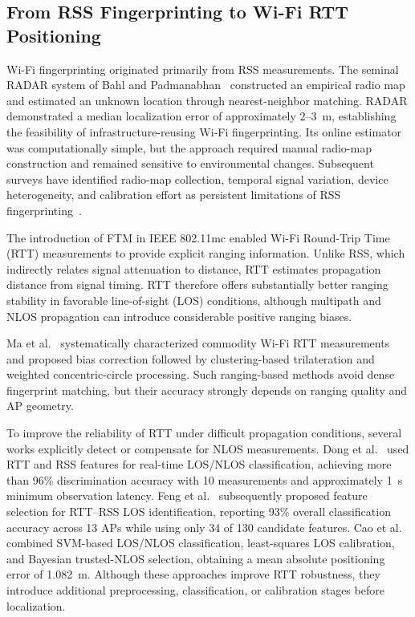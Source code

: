 \subsection{From RSS Fingerprinting to Wi-Fi RTT Positioning}
\label{subsec:rw_rss_rtt}

Wi-Fi fingerprinting originated primarily from RSS measurements. The seminal RADAR system of Bahl and Padmanabhan~\cite{bahl2000radar} constructed an empirical radio map and estimated an unknown location through nearest-neighbor matching. RADAR demonstrated a median localization error of approximately 2--3~m, establishing the feasibility of infrastructure-reusing Wi-Fi fingerprinting. Its online estimator was computationally simple, but the approach required manual radio-map construction and remained sensitive to environmental changes. Subsequent surveys have identified radio-map collection, temporal signal variation, device heterogeneity, and calibration effort as persistent limitations of RSS fingerprinting~\cite{he2016wifiFingerprint}.

The introduction of FTM in IEEE 802.11mc enabled Wi-Fi Round-Trip Time (RTT) measurements to provide explicit ranging information. Unlike RSS, which indirectly relates signal attenuation to distance, RTT estimates propagation distance from signal timing. RTT therefore offers substantially better ranging stability in favorable line-of-sight (LOS) conditions, although multipath and NLOS propagation can introduce considerable positive ranging biases.

Ma et al.~\cite{ma2022rtt} systematically characterized commodity Wi-Fi RTT measurements and proposed bias correction followed by clustering-based trilateration and weighted concentric-circle processing. Such ranging-based methods avoid dense fingerprint matching, but their accuracy strongly depends on ranging quality and AP geometry.

To improve the reliability of RTT under difficult propagation conditions, several works explicitly detect or compensate for NLOS measurements. Dong et al.~\cite{dong2022nlos} used RTT and RSS features for real-time LOS/NLOS classification, achieving more than 96\% discrimination accuracy with 10 measurements and approximately 1~s minimum observation latency. Feng et al.~\cite{feng2022los} subsequently proposed feature selection for RTT--RSS LOS identification, reporting 93\% overall classification accuracy across 13 APs while using only 34 of 130 candidate features. Cao et al.~\cite{cao2024los} combined SVM-based LOS/NLOS classification, least-squares LOS calibration, and Bayesian trusted-NLOS selection, obtaining a mean absolute positioning error of 1.082~m. Although these approaches improve RTT robustness, they introduce additional preprocessing, classification, or calibration stages before localization.

